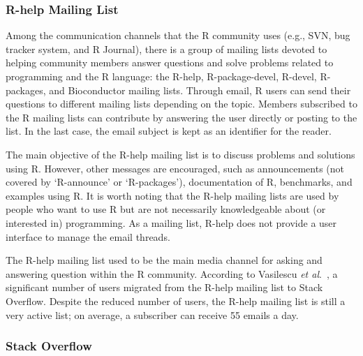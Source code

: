 \documentclass{sig-alternate-05-2015}
\begin{document}
\subsubsection{R-help Mailing List}

	Among the communication channels that the R community uses (e.g., SVN, bug tracker system, and R Journal), there is a group of mailing lists devoted to helping community members answer questions and solve problems related to programming and the R language: the R-help, R-package-devel, R-devel, R-packages, and Bioconductor mailing lists.
	Through email, R users can send their questions to different mailing lists depending on the topic.
	Members subscribed to the R mailing lists can contribute by answering the user directly or posting to the list.
	In the last case, the email subject is kept as an identifier for the reader.

	The main objective of the R-help mailing list is to discuss problems and solutions using R. 
	However, other messages are encouraged, such as announcements (not covered by `R-announce' or `R-packages'), documentation of R, benchmarks, and examples using R. 
	It is worth noting that the R-help mailing lists are used by people who want to use R but are not necessarily knowledgeable about (or interested in) programming. 
	As a mailing list, R-help does not provide a user interface to manage the email threads.

	The R-help mailing list used to be the main media channel for asking and answering question within the R community.
	According to Vasilescu \textit{et al}.~\cite{Vasilescu2014c}, a significant number of users migrated from the R-help mailing list to Stack Overflow. 
	Despite the reduced number of users, the R-help mailing list is still a very active list; 
	on average, a subscriber can receive 55 emails a day.

\subsubsection{Stack Overflow}
\label{subsec:Rtag}
\end{document}
